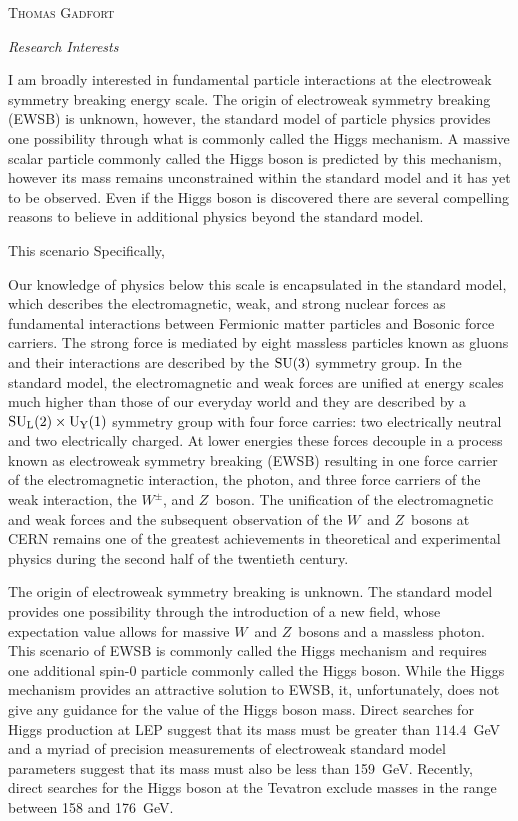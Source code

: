 \documentclass[12pt]{article}
\newcommand{\hr}{\centerline{\hskip 30mm\hrulefill\hskip 30mm}}
\begin{document}
\begin{center}
{\LARGE \textsc{Thomas Gadfort}}
\smallskip

\emph{Research Interests}
\end{center}

\vspace{-11pt}
\hr

\bigskip
 
I am broadly interested in fundamental particle interactions at the electroweak symmetry breaking energy scale. The origin of electroweak symmetry breaking (EWSB) is unknown, however, the standard model of particle physics provides one possibility through what is commonly called the Higgs mechanism. A massive scalar particle commonly called the Higgs boson is predicted by this mechanism, however its mass remains unconstrained within the standard model and it has yet to be observed. Even if the Higgs boson is discovered there are several compelling reasons to believe in additional physics beyond the standard model.

This scenario 
Specifically, 


Our knowledge of physics below this scale is encapsulated in the standard model, which describes the electromagnetic, weak, and strong nuclear forces as fundamental interactions between Fermionic matter particles and Bosonic force carriers. The strong force is mediated by eight massless particles known as gluons  and their interactions are described by the $\rm{SU}(3)$ symmetry group. In the standard model, the electromagnetic and weak forces are unified at energy scales much higher than those of our everyday world and they are described by a $\rm{SU}_{\rm{L}}(2) \times \rm{U}_{\rm{Y}}(1)$ symmetry group with four force carries: two electrically neutral and two electrically charged. At lower energies these forces decouple in a process known as electroweak symmetry breaking (EWSB) resulting in one force carrier of the electromagnetic interaction, the photon, and three force carriers of the weak interaction, the $W^{\pm}$, and $Z$~boson. The unification of the electromagnetic and weak forces and the subsequent observation of the $W$~and $Z$~bosons at CERN remains one of the greatest achievements in theoretical and experimental physics during the second half of the twentieth century.

The origin of electroweak symmetry breaking is unknown. The standard model provides one possibility through the introduction of a new field, whose expectation value allows for massive $W$~and $Z$~bosons and a massless photon. This scenario of EWSB is commonly called the Higgs mechanism and requires one additional spin-0 particle commonly called the Higgs boson. While the Higgs mechanism provides an attractive solution to EWSB, it, unfortunately, does not give any guidance for the value of the Higgs boson mass. Direct searches for Higgs production at LEP suggest that its mass must be greater than $114.4$~GeV and a myriad of precision measurements of electroweak standard model parameters suggest that its mass must also be less than 159~GeV. Recently, direct searches for the Higgs boson at the Tevatron exclude masses in the range between 158 and 176~GeV.
\end{document}
